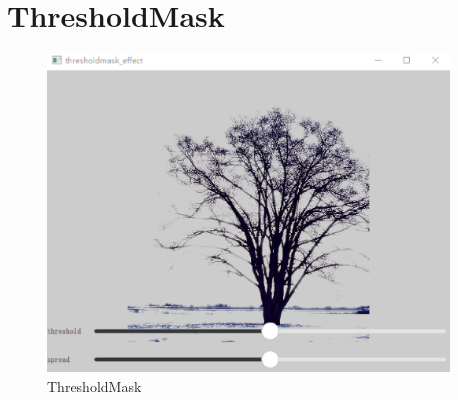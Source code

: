 ﻿




\FloatBarrier
\section{
ThresholdMask
}\label{c000015s000026}


\begin{figure}[htb] %
\marginnote{\setlength\fboxsep{2pt}\fbox{\footnotesize{\kaishu\figurename\,}\footnotesize{\ref{p000042}}}}\centering %
\includegraphics[width=0.95\textwidth]{the_book_image/p000042.eps} %
\caption{ThresholdMask} %
\label{p000042} %
\end{figure}


